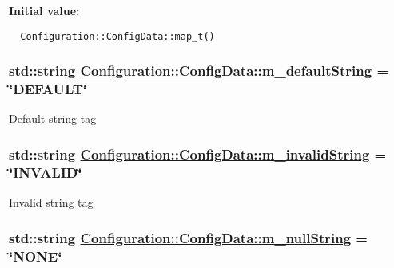 \textbf{Initial value:}

\begin{Code}\begin{verbatim} 
  Configuration::ConfigData::map_t()
\end{verbatim}\end{Code}
\hypertarget{classConfiguration_1_1ConfigData_2444b2697d81af2d1120f04c34d77857}{
\subsubsection[m\_\-defaultString]{\setlength{\rightskip}{0pt plus 5cm}std::string \hyperlink{classConfiguration_1_1ConfigData_2444b2697d81af2d1120f04c34d77857}{Configuration::Config\-Data::m\_\-default\-String} = \char`\"{}DEFAULT\char`\"{}}}
\label{classConfiguration_1_1ConfigData_2444b2697d81af2d1120f04c34d77857}


Default string tag \hypertarget{classConfiguration_1_1ConfigData_71636ef903c56dca29298a03a987978a}{
\subsubsection[m\_\-invalidString]{\setlength{\rightskip}{0pt plus 5cm}std::string \hyperlink{classConfiguration_1_1ConfigData_71636ef903c56dca29298a03a987978a}{Configuration::Config\-Data::m\_\-invalid\-String} = \char`\"{}INVALID\char`\"{}}}
\label{classConfiguration_1_1ConfigData_71636ef903c56dca29298a03a987978a}


Invalid string tag \hypertarget{classConfiguration_1_1ConfigData_dd898944bb87347fd5ebf9697d42dc7a}{
\subsubsection[m\_\-nullString]{\setlength{\rightskip}{0pt plus 5cm}std::string \hyperlink{classConfiguration_1_1ConfigData_dd898944bb87347fd5ebf9697d42dc7a}{Configuration::Config\-Data::m\_\-null\-String} = \char`\"{}NONE\char`\"{}}}
\label{classConfiguration_1_1ConfigData_dd898944bb87347fd5ebf9697d42dc7a}


